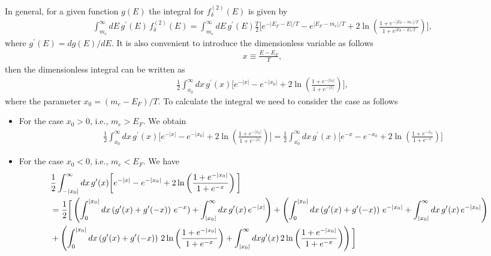 \documentclass[onecolumn,preprintnumbers,amsmath,amssymb]{revtex4}
\begin{document}
In general, for a given function $g(E)$ the integral for $f_\delta^{(2)}(E)$ is given by
\begin{align}
\label{Integral002}
\int^\infty_{m_e}dE\,g^\prime(E)\,f^{(2)}_\delta(E)=\int^\infty_{m_e}dE\,g^\prime(E)\frac{T}{2}\bigg[e^{-|E_F-E|/T}-e^{|E_F-m_e|/T}+2\ln\left(\frac{1+e^{-|E_F-m_e|/T}}{1+e^{|E_F-E|/T}}\right)\bigg],
\end{align}
where $g^\prime(E)=dg(E)/dE$. It is also convenient to introduce the dimensionless variable as follows
\begin{align}
x\equiv\frac{E-E_F}{T},
\end{align}
then the dimensionless integral can be written as
\begin{align}
\frac{1}{2}\int^\infty_{x_0}dx\,g^\prime(x)\bigg[e^{-|x|}-e^{-|x_0|}+2\ln\left(\frac{1+e^{-|x_0|}}{1+e^{-|x|}}\right)\bigg],
\end{align}
where the parameter $x_0=(m_e-E_F)/T$. To calculate the integral we need to consider the case as follows
\begin{itemize}
  \item For the case $x_0>0$, i.e., $m_e>E_F$. We obtain
  \begin{align}
  &\frac{1}{2}\int^\infty_{x_0}dx\,g^\prime(x)\bigg[e^{-|x|}-e^{-|x_0|}+2\ln\left(\frac{1+e^{-|x_0|}}{1+e^{-|x|}}\right)\bigg]=\frac{1}{2}\int^\infty_{x_0}dx\,g^\prime(x)\bigg[e^{-x}-e^{-x_0}+2\ln\left(\frac{1+e^{-x_0}}{1+e^{-x}}\right)\bigg]
  \end{align}
  \item For the case $x_0<0$, i.e., $m_e<E_F$. We have
  \begin{align}
   &\frac{1}{2}\int^\infty_{-|x_0|}dx\,g^\prime(x)\bigg[e^{-|x|}-e^{-|x_0|}+2\ln\left(\frac{1+e^{-|x_0|}}{1+e^{-x}}\right)\bigg]\notag\\
   &=\frac{1}{2}\bigg[\left(\int^{|x_0|}_0dx\left(g^\prime(x)+g^\prime(-x)\right)\,e^{-x})+\int^\infty_{|x_0|}dx\,g^\prime(x)\,e^{-|x|}\right)+\left(\int^{|x_0|}_0dx\left(g^\prime(x)+g^\prime(-x)\right)\,e^{-|x_0|}+\int^\infty_{|x_0|}dx\,g^\prime(x)\,e^{-|x_0|}\right)\notag\\
   &+\left(\int^{|x_0|}_0dx\left(g^\prime(x)+g^\prime(-x)\right)\,2\ln\left(\frac{1+e^{-|x_0|}}{1+e^{-x}}\right)+\int^\infty_{|x_0|}dxg^\prime(x)\,2\ln\left(\frac{1+e^{-|x_0|}}{1+e^{-x}}\right)\right)\bigg]
  \end{align}
\end{itemize}
\end{document}
